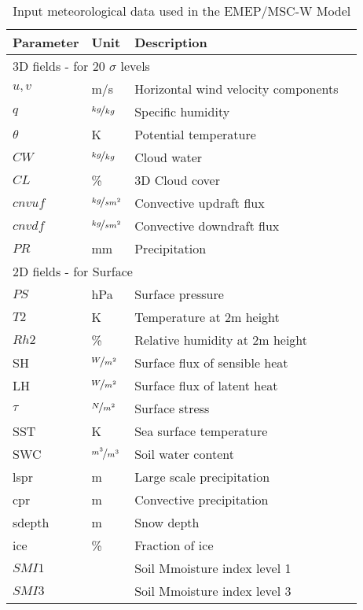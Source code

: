 \begin{table}[h!]
\caption{Input meteorological data used in the EMEP/MSC-W Model
   \label{Tab:metinput}}
\begin{center}
\begin{tabular}{p{6cm}lll}
\hline
Parameter      & Unit & Description          \\
\hline
\multicolumn{3}{l}{3D fields - for 20 $\sigma$ levels} \\
$u,v$  &  m/s     & Horizontal wind velocity components   \\
$q$    &  $\nicefrac{kg}{kg}$   & Specific humidity           \\
$\theta$       & K  & Potential temperature \\
$CW$             & $\nicefrac{kg}{kg}$ & Cloud water          \\
$CL$             & \% & 3D Cloud cover            \\
$cnvuf$          & $\nicefrac{kg}{sm^2}$ & Convective updraft flux \\
$cnvdf$          & $\nicefrac{kg}{sm^2}$ & Convective downdraft flux \\
$PR$             & mm & Precipitation         \\
\hline
\multicolumn{3}{l}{2D fields - for Surface} \\
$PS$             & hPa & Surface pressure                     \\
$T2$          & K  & Temperature at 2m height               \\
$Rh2$             & \% & Relative humidity at 2m height \\
SH              &  $\nicefrac{W}{m^{2}}$ & Surface flux of sensible heat \\
LH             & $\nicefrac{W}{m^{2}}$ & Surface flux of latent heat \\
$\tau$         & $\nicefrac{N}{m^{2}}$ & Surface stress               \\
SST            & K & Sea surface temperature \\
SWC            & $\nicefrac{m^{3}}{m^{3}}$ & Soil water content      \\
lspr             & m & Large scale precipitation \\
cpr              & m & Convective precipitation \\
sdepth         & m & Snow depth \\
ice            & \% & Fraction of ice \\  
$SMI1$           &    & Soil Mmoisture index level 1 \\
$SMI3$           &    & Soil Mmoisture index level 3 \\

\hline
\end{tabular}\\
\end{center}
\end{table}



